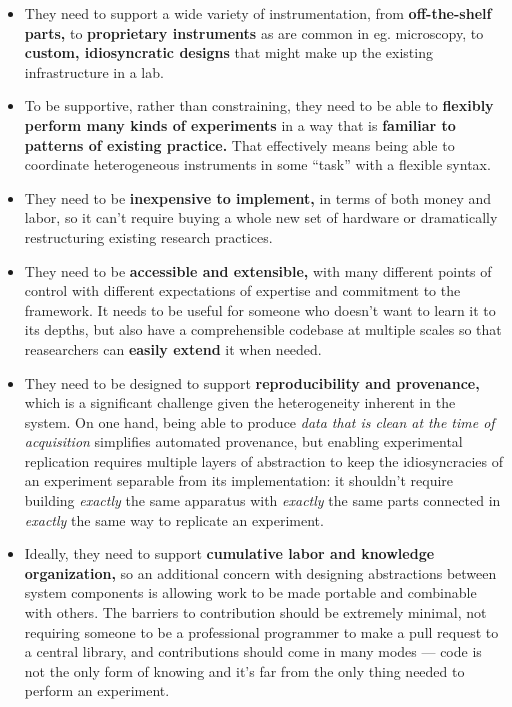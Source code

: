 \documentclass[notoc]{tufte-book}
\begin{document}
\begin{itemize}

\item
  They need to support a wide variety of instrumentation, from
  \textbf{off-the-shelf parts,} to \textbf{proprietary instruments} as
  are common in eg. microscopy, to \textbf{custom, idiosyncratic
  designs} that might make up the existing infrastructure in a lab.
\item
  To be supportive, rather than constraining, they need to be able to
  \textbf{flexibly perform many kinds of experiments} in a way that is
  \textbf{familiar to patterns of existing practice.} That effectively
  means being able to coordinate heterogeneous instruments in some
  ``task'' with a flexible syntax.
\item
  They need to be \textbf{inexpensive to implement,} in terms of both
  money and labor, so it can't require buying a whole new set of
  hardware or dramatically restructuring existing research practices.
\item
  They need to be \textbf{accessible and extensible,} with many
  different points of control with different expectations of expertise
  and commitment to the framework. It needs to be useful for someone who
  doesn't want to learn it to its depths, but also have a comprehensible
  codebase at multiple scales so that reasearchers can \textbf{easily
  extend} it when needed.
\item
  They need to be designed to support \textbf{reproducibility and
  provenance,} which is a significant challenge given the heterogeneity
  inherent in the system. On one hand, being able to produce \emph{data
  that is clean at the time of acquisition} simplifies automated
  provenance, but enabling experimental replication requires multiple
  layers of abstraction to keep the idiosyncracies of an experiment
  separable from its implementation: it shouldn't require building
  \emph{exactly} the same apparatus with \emph{exactly} the same parts
  connected in \emph{exactly} the same way to replicate an experiment.
\item
  Ideally, they need to support \textbf{cumulative labor and knowledge
  organization,} so an additional concern with designing abstractions
  between system components is allowing work to be made portable and
  combinable with others. The barriers to contribution should be
  extremely minimal, not requiring someone to be a professional
  programmer to make a pull request to a central library, and
  contributions should come in many modes --- code is not the only form
  of knowing and it's far from the only thing needed to perform an
  experiment.
\end{itemize}
\end{document}
